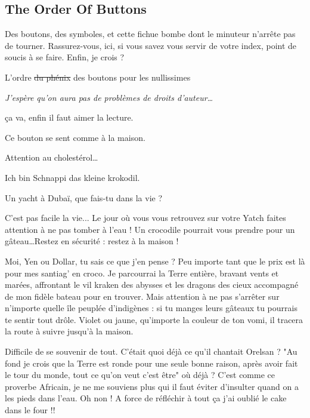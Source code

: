\subsection{The Order Of Buttons}
Des boutons, des symboles, et cette fichue bombe dont le minuteur n'arrête pas de tourner. Rassurez-vous, ici, si vous savez vous servir de votre index, point de soucis à se faire. Enfin, je crois ?
\vspace{.5cm}
\begin{modulebox}{L'ordre \sout{du phénix} des boutons pour les nullissimes}
  \begin{hangingpar}
    \textit{J'espère qu'on aura pas de problèmes de droits d'auteur\dots}
  \end{hangingpar}
  \begin{moduleaction}[Difficulté]
    ça va, enfin il faut aimer la lecture.
  \end{moduleaction}
  \begin{moduleaction}[bouton 1]
    Ce bouton se sent comme à la maison.
  \end{moduleaction}
  \begin{moduleaction}[bouton 2]
    Attention au cholestérol\dots
  \end{moduleaction}
  \begin{moduleaction}[bouton 3]
    Ich bin Schnappi das kleine krokodil.
  \end{moduleaction}
  \begin{moduleaction}[bouton 4]
    Un yacht à Dubaï, que fais-tu dans la vie ?
  \end{moduleaction}
\end{modulebox}
\vspace{.5cm}

C'est pas facile la vie... Le jour où vous vous retrouvez sur votre Yatch faites attention à ne pas tomber à l'eau ! Un crocodile pourrait vous prendre pour un gâteau\dots Restez en sécurité : restez à la maison !

Moi, Yen ou Dollar, tu sais ce que j'en pense ? Peu importe tant que le prix est là pour mes santiag' en croco. Je parcourrai la Terre entière, bravant vents et marées, affrontant le vil kraken des abysses et les dragons des cieux accompagné de mon fidèle bateau pour en trouver. Mais attention à ne pas s'arrêter sur n'importe quelle île peuplée d'indigènes : si tu manges leurs gâteaux tu pourrais te sentir tout drôle. Violet ou jaune, qu'importe la couleur de ton vomi, il tracera la route à suivre jusqu'à la maison.

Difficile de se souvenir de tout. C'était quoi déjà ce qu'il chantait Orelsan ? "Au fond je crois que la Terre est ronde pour une seule bonne raison, après avoir fait le tour du monde, tout ce qu'on veut c'est être" où déjà ? C'est comme ce proverbe Africain, je ne me souviens plus qui il faut éviter d'insulter quand on a les pieds dans l'eau. Oh non ! A force de réfléchir à tout ça j'ai oublié le cake dans le four !! 
\newpage

